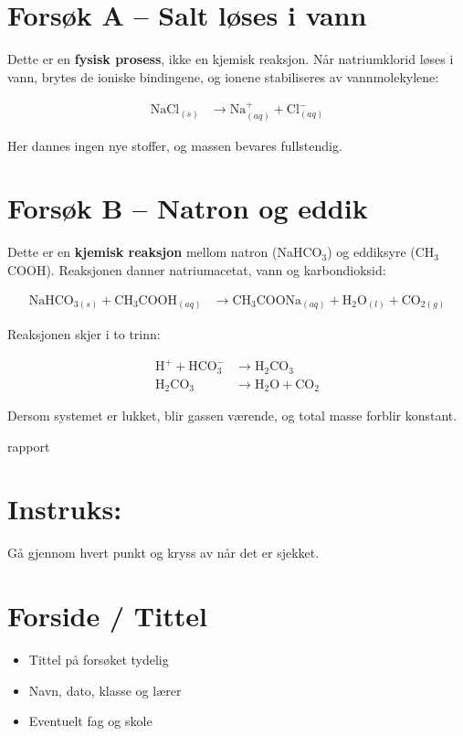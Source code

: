 \documentclass[a4paper,12pt]{article}
\begin{document}
\section{Forsøk A – Salt løses i vann}

Dette er en \textbf{fysisk prosess}, ikke en kjemisk reaksjon. 
Når natriumklorid løses i vann, brytes de ioniske bindingene, og ionene stabiliseres av vannmolekylene:

\begin{align*}
\text{NaCl}_{(s)} &\rightarrow \text{Na}^{+}_{(aq)} + \text{Cl}^{-}_{(aq)}
\end{align*}

Her dannes ingen nye stoffer, og massen bevares fullstendig.

\section{Forsøk B – Natron og eddik}

Dette er en \textbf{kjemisk reaksjon} mellom natron (NaHCO$_3$) og eddiksyre (CH$_3$COOH). 
Reaksjonen danner natriumacetat, vann og karbondioksid:

\begin{align*}
\text{NaHCO}_{3(s)} + \text{CH}_{3}\text{COOH}_{(aq)} 
&\rightarrow \text{CH}_{3}\text{COONa}_{(aq)} + \text{H}_{2}\text{O}_{(l)} + \text{CO}_{2(g)}
\end{align*}

Reaksjonen skjer i to trinn:

\begin{align*}
\text{H}^{+} + \text{HCO}_{3}^{-} &\rightarrow \text{H}_{2}\text{CO}_{3} \\
\text{H}_{2}\text{CO}_{3} &\rightarrow \text{H}_{2}\text{O} + \text{CO}_{2}
\end{align*}

Dersom systemet er lukket, blir gassen værende, og total masse forblir konstant.
\maketitle  rapport

\section*{Instruks:}
Gå gjennom hvert punkt og kryss av når det er sjekket.

\section*{Forside / Tittel}
\begin{itemize}
    \item Tittel på forsøket tydelig
    \item Navn, dato, klasse og lærer
    \item Eventuelt fag og skole
\end{itemize}
\end{document}
